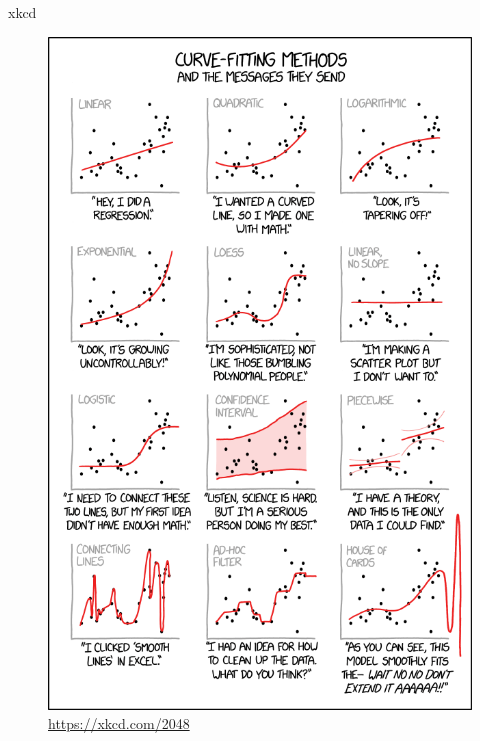 \documentclass[
  ignorenonframetext,
]{beamer}
\begin{document}
\begin{frame}{xkcd}
\protect\hypertarget{xkcd}{}

\begin{figure}
\centering
\includegraphics[width=\textwidth,height=0.75\textheight]{curve_fitting.png}
\caption{\url{https://xkcd.com/2048}}
\end{figure}

\end{frame}
\end{document}
